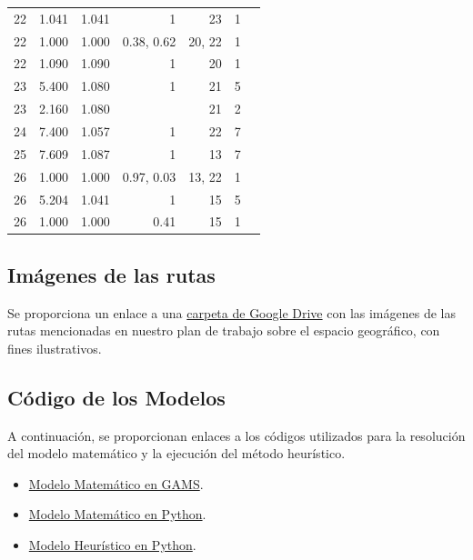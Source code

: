 \documentclass{amsart}
\begin{document}
\begin{table}[!htp]
\begin{tabular}{lrrrrrr}
        22 &1.041 &1.041 &1 &23 &1 \\
        22 &1.000 &1.000 &0.38, 0.62 &20, 22 &1 \\
        22 &1.090 &1.090 &1 &20 &1 \\
        23 &5.400 &1.080 &1 &21 &5 \\
        23 &2.160 &1.080 & &21 &2 \\
        24 &7.400 &1.057 &1 &22 &7 \\
        25 &7.609 &1.087 &1 &13 &7 \\
        26 &1.000 &1.000 &0.97, 0.03 &13, 22 &1 \\
        26 &5.204 &1.041 &1 &15 &5 \\
        26 &1.000 &1.000 &0.41 &15 &1 \\
        \bottomrule
        \end{tabular}
    \end{table}

    \subsection{Imágenes de las rutas}
    Se proporciona un enlace a una \href{https://drive.google.com/drive/folders/1J6JZLl-rk_XYLjii0Jzr_UYmxpPLzrKB?usp=sharing}{carpeta de Google Drive} con las imágenes de las rutas mencionadas en nuestro plan de trabajo sobre el espacio geográfico, con fines ilustrativos.

    \subsection{Código de los Modelos}
    A continuación, se proporcionan enlaces a los códigos utilizados para la resolución del modelo matemático y la ejecución del método heurístico.
        \begin{itemize}
            \item \href{https://drive.google.com/file/d/1DtK2yw0oqNw_BoB6GcFXdXOA-o_JnqTO/view?usp=sharing}{Modelo Matemático en GAMS}.
            \item \href{https://drive.google.com/file/d/1YB3pR9slex8ZjgPHzGTEEW1fApkLSBaB/view?usp=sharing}{Modelo Matemático en Python}.
            \item   \href{https://drive.google.com/file/d/1ENJ2UtdBE8_bLTfIO_R48XP1BJ7_Q2fo/view?usp=sharing}{Modelo Heurístico en Python}.

            
        \end{itemize}
\end{document}
